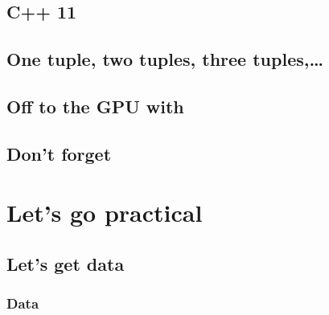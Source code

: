 \documentclass[twoside]{report}
\begin{document}
\section{C++ 11}

\section{One tuple, two tuples, three tuples,\dots}

\section{\EIGEN}

\section{\Boost}

\section{\MetaPhysicL}

\section{Off to the GPU with \VexCL}

\section{\ViennaCL}

\section{\GRVY}

\section{Don't forget \Doxygen}
\label{dox}


\chapter{Let's go practical}
\chaptermark{\ANTIOCHPrac}
\label{Antioch:practice}

\section{Let's get data}

\subsection{Data}
\label{kin:data}

\end{document}
